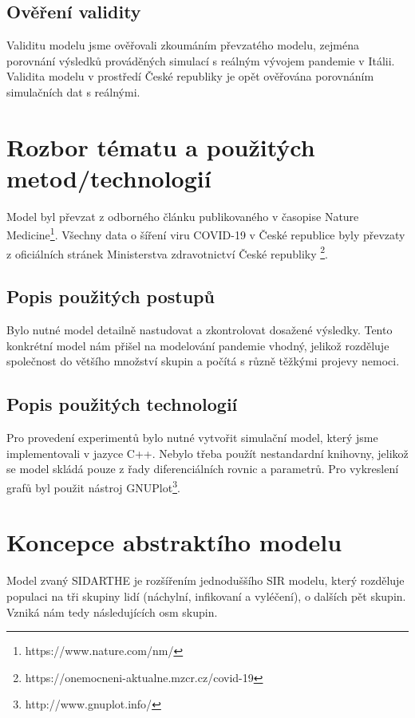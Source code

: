 \documentclass[a4paper,11pt]{article}
\begin{document}
	\subsection{Ověření validity}
		Validitu modelu jsme ověřovali zkoumáním převzatého modelu, zejména porovnání výsledků prováděných simulací s reálným vývojem pandemie v Itálii. Validita modelu v prostředí České republiky je opět ověřována porovnáním simulačních dat s reálnými.
	
	\section{Rozbor tématu a použitých metod/technologií}
		Model byl převzat z odborného článku \cite{source} publikovaného v časopise Nature Medicine\footnote{https://www.nature.com/nm/}. Všechny data o šíření viru COVID-19 v České republice byly převzaty z oficiálních stránek Ministerstva zdravotnictví České republiky \footnote{https://onemocneni-aktualne.mzcr.cz/covid-19}.
	
	\subsection{Popis použitých postupů}
		Bylo nutné model detailně nastudovat a zkontrolovat dosažené výsledky. Tento konkrétní model nám přišel na modelování pandemie vhodný, jelikož rozděluje společnost do většího množství skupin a počítá s různě těžkými projevy nemoci.
	
	\subsection{Popis použitých technologií}
		Pro provedení experimentů bylo nutné vytvořit simulační model, který jsme implementovali v jazyce C++. Nebylo třeba použít nestandardní knihovny, jelikož se model skládá pouze z řady diferenciálních rovnic a parametrů. Pro vykreslení grafů byl použit nástroj GNUPlot\footnote{http://www.gnuplot.info/}.
	
	\pagebreak		
	\section{Koncepce abstraktího modelu}
		Model zvaný SIDARTHE je rozšířením jednoduššího SIR modelu, který rozděluje populaci na tři skupiny lidí (náchylní, infikovaní a vyléčení), o dalších pět skupin. Vzniká nám tedy následujících osm skupin.
		
\end{document}
